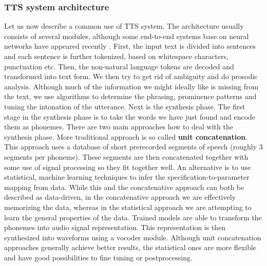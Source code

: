 \subsubsection*{TTS system architecture\cite{taylor2009text}}
Let us now describe a common use of TTS system.
The architecture usually consists of several modules, although some end-to-end systems base on neural networks have appeared recently\cite{van2016wavenet} \cite{wang2017tacotron}.
First, the input text is divided into sentences and each sentence is further tokenized, based on whitespace characters, punctuation etc.
Then, the non-natural language tokens are decoded and transformed into text form.
We then try to get rid of ambiguity and do prosodic analysis.
Although much of the information we might ideally like is missing from the text, we use algorithms to determine the phrasing, prominence patterns and tuning the intonation of the utterance.
Next is the synthesis phase. The first stage in the synthesis phase is to take the words we have just found and encode them as phonemes.
There are two main approaches how to deal with the synthesis phase.
More traditional approach is so called \textbf{unit concatenation}.
This approach uses a database of short prerecorded segments of speech (roughly 3 segments per phoneme).
These segments are then concatenated together with some use of signal processing so they fit together well.
An alternative is to use statistical, machine learning techniques to infer the specification-to-parameter mapping from data.
While this and the concatenative approach can both be described as data-driven, in the concatenative approach we are effectively memorizing the data, whereas in the statistical approach we are attempting to learn the general properties of the data.
Trained models are able to transform the phonemes into audio signal representation.
This representation is then synthesized into waveforms using a vocoder module.
Although unit concatenation approaches generally achieve better results, the statistical ones are more flexible and have good possibilities to fine tuning or postprocessing.
